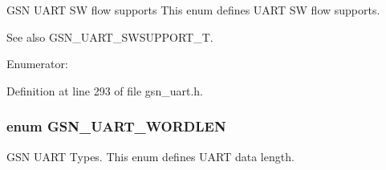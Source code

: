 GSN UART SW flow supports This enum defines UART SW flow supports. 

\begin{DoxySeeAlso}{See also}
GSN\_\-UART\_\-SWSUPPORT\_\-T. 
\end{DoxySeeAlso}
\begin{Desc}
\item[Enumerator: ]\par
\begin{description}
\item[{\em 
\hypertarget{a00656_gga7905ed9a5914128d4dd4e1f0ff7a8a56ae730ad90159b4ce3273e733202e78a65}{
GSN\_\-UART\_\-SWFLOW\_\-NO\_\-SUPPORT}
\label{a00656_gga7905ed9a5914128d4dd4e1f0ff7a8a56ae730ad90159b4ce3273e733202e78a65}
}]\item[{\em 
\hypertarget{a00656_gga7905ed9a5914128d4dd4e1f0ff7a8a56a48ad312611c254a0e7236e5f3584a26a}{
GSN\_\-UART\_\-SWFLOW\_\-SUPPORT}
\label{a00656_gga7905ed9a5914128d4dd4e1f0ff7a8a56a48ad312611c254a0e7236e5f3584a26a}
}]\end{description}
\end{Desc}



Definition at line 293 of file gsn\_\-uart.h.

\hypertarget{a00656_ga9082153fb94765f4ce91b584f1d8a0a3}{
\subsubsection[{GSN\_\-UART\_\-WORDLEN}]{\setlength{\rightskip}{0pt plus 5cm}enum {\bf GSN\_\-UART\_\-WORDLEN}}}
\label{a00656_ga9082153fb94765f4ce91b584f1d8a0a3}


GSN UART Types. This enum defines UART data length. 

